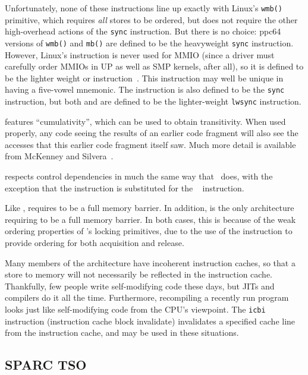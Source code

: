 Unfortunately, none of these instructions line up exactly with Linux's
{\tt wmb()} primitive, which requires {\em all} stores to be ordered,
but does not require the other high-overhead actions of the {\tt sync}
instruction.
But there is no choice:
{ppc64} versions of {\tt wmb()} and {\tt mb()} are defined to be the
heavyweight {\tt sync} instruction.
However, Linux's  instruction is never used for MMIO
(since a driver must carefully order MMIOs in UP as well as
SMP kernels, after all), so it is defined to be the lighter weight
 or  instruction~\cite{PaulEMcKenney2016LinuxKernelMMIO}.
This instruction may well be unique in having a five-vowel mnemonic.
The  instruction is also defined to be the {\tt sync}
instruction, but both  and  are defined to
be the lighter-weight {\tt lwsync} instruction.

\Power{} features ``cumulativity'', which can be used to obtain
transitivity.
When used properly, any code seeing the results of an earlier
code fragment will also see the accesses that this earlier code
fragment itself saw.
Much more detail is available from
McKenney and Silvera~\cite{PaulEMcKenneyN2745r2009}.

\Power{} respects control dependencies in much the same way that \ARM\
does, with the exception that the \Power{}  instruction
is substituted for the \ARM\ \co{ISB} instruction.

Like , \Power{} requires  to be
a full memory barrier.
In addition, \Power{} is the only architecture requiring
 to be a full memory barrier.
In both cases, this is because of the weak ordering properties
of \Power{}'s locking primitives, due to the use of the 
instruction to provide ordering for both acquisition and release.

Many members of the \Power{} architecture have incoherent instruction
caches, so that a store to memory will not necessarily be reflected
in the instruction cache.
Thankfully, few people write self-modifying code these days, but JITs
and compilers do it all the time.
Furthermore, recompiling a recently run program looks just like
self-modifying code from the CPU's viewpoint.
The {\tt icbi} instruction (instruction cache block invalidate)
invalidates a specified cache line from
the instruction cache, and may be used in these situations.

\subsection{SPARC TSO}

